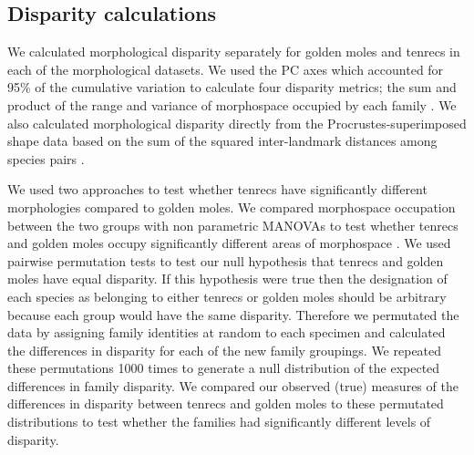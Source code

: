 \documentclass[12pt,a4paper]{article}
\begin{document}
	
\subsection{Disparity calculations}

	We calculated morphological disparity separately for golden moles and tenrecs in each of the morphological datasets. We used the PC axes which accounted for 95\% of the cumulative variation to calculate four disparity metrics; the sum and product of the range and variance of morphospace occupied by each family \citep{Brusatte2008, Foth2012, Ruta2013}. We also calculated morphological disparity directly from the Procrustes-superimposed shape data based on the sum of the squared inter-landmark distances among species pairs \citep[ZelditchMD,][]{Zelditch2012}. 

	We used two approaches to test whether tenrecs have significantly different morphologies compared to golden moles. We compared morphospace occupation between the two groups with non parametric MANOVAs \citep{Anderson2001} to test whether tenrecs and golden moles occupy significantly different areas of morphospace \citep[e.g][]{Serb2011, Ruta2013}. 
	We used pairwise permutation tests to test our null hypothesis that tenrecs and golden moles have equal disparity. If this hypothesis were true then the designation of each species as belonging to either tenrecs or golden moles should be arbitrary because each group would have the same disparity. Therefore we permutated the data by assigning family identities at random to each specimen and calculated the differences in disparity for each of the new family groupings. We repeated these permutations 1000 times to generate a null distribution of the expected differences in family disparity. We compared our observed (true) measures of the differences in disparity between tenrecs and golden moles to these permutated distributions to test whether the families had significantly different levels of disparity.
\end{document}
